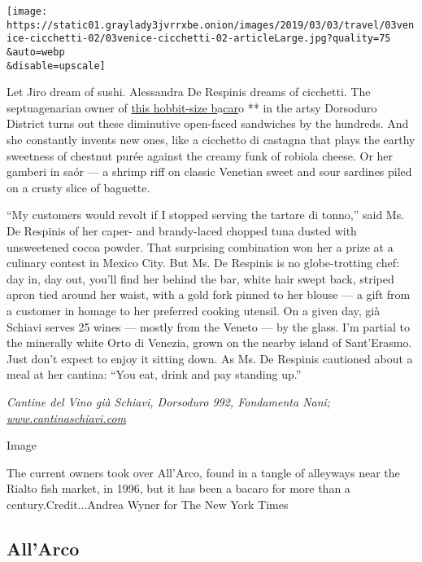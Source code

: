 \texttt{[image: https://static01.graylady3jvrrxbe.onion/images/2019/03/03/travel/03venice-cicchetti-02/03venice-cicchetti-02-articleLarge.jpg?quality=75\\\&auto=webp\\\&disable=upscale]}

Let Jiro dream of sushi. Alessandra De Respinis dreams of cicchetti. The
septuagenarian owner of \href{http://www.cantinaschiavi.com/}{this
hobbit-size b}a\href{http://www.cantinaschiavi.com/}{car}o ** in the
artsy Dorsoduro District turns out these diminutive open-faced
sandwiches by the hundreds. And she constantly invents new ones, like a
cicchetto di castagna that plays the earthy sweetness of chestnut purée
against the creamy funk of robiola cheese. Or her gamberi in saór --- a
shrimp riff on classic Venetian sweet and sour sardines piled on a
crusty slice of baguette.

``My customers would revolt if I stopped serving the tartare di tonno,''
said Ms. De Respinis of her caper- and brandy-laced chopped tuna dusted
with unsweetened cocoa powder. That surprising combination won her a
prize at a culinary contest in Mexico City. But Ms. De Respinis is no
globe-trotting chef: day in, day out, you'll find her behind the bar,
white hair swept back, striped apron tied around her waist, with a gold
fork pinned to her blouse --- a gift from a customer in homage to her
preferred cooking utensil. On a given day, già Schiavi serves 25 wines
--- mostly from the Veneto --- by the glass. I'm partial to the
minerally white Orto di Venezia, grown on the nearby island of
Sant'Erasmo. Just don't expect to enjoy it sitting down. As Ms. De
Respinis cautioned about a meal at her cantina: ``You eat, drink and pay
standing up.''

\emph{Cantine del Vino già Schiavi, Dorsoduro 992, Fondamenta Nani;
\href{http://www.cantinaschiavi.com}{www.cantinaschiavi.com}}

Image

The current owners took over All'Arco, found in a tangle of alleyways
near the Rialto fish market, in 1996, but it has been a bacaro for more
than a century.Credit...Andrea Wyner for The New York Times

\hypertarget{allarco}{%
\subsection{All'Arco}\label{allarco}}


